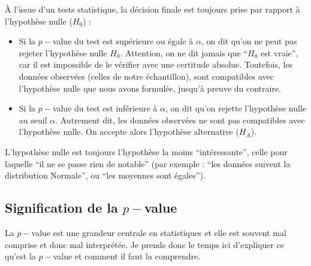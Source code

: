 \documentclass[
  a4paper,
  DIV=11,
  numbers=noendperiod,
  oneside]{scrreprt}
\providecommand{\tightlist}{%
  \setlength{\itemsep}{0pt}\setlength{\parskip}{0pt}}\usepackage{longtable,booktabs,array}
\begin{document}
\begin{tcolorbox}[enhanced jigsaw, breakable, toprule=.15mm, colbacktitle=quarto-callout-warning-color!10!white, colframe=quarto-callout-warning-color-frame, arc=.35mm, bottomtitle=1mm, opacityback=0, title=\textcolor{quarto-callout-warning-color}{\faExclamationTriangle}\hspace{0.5em}{Tests et décision : rappel de cours}, bottomrule=.15mm, colback=white, toptitle=1mm, rightrule=.15mm, leftrule=.75mm, opacitybacktitle=0.6, left=2mm, titlerule=0mm, coltitle=black]

À l'issue d'un tests statistique, la décision finale est toujours prise
par rapport à l'hypothèse nulle (\(H_0\)) :

\begin{itemize}
\tightlist
\item
  Si la \(p-\)value du test est supérieure ou égale à \(\alpha\), on dit
  qu'on ne peut pas rejeter l'hypothèse nulle \(H_0\). Attention, on ne
  dit jamais que ``\(H_0\) est vraie'', car il est impossible de le
  vérifier avec une certitude absolue. Toutefois, les données observées
  (celles de notre échantillon), sont compatibles avec l'hypothèse nulle
  que nous avons formulée, jusqu'à preuve du contraire.
\item
  Si la \(p-\)value du test est inférieure à \(\alpha\), on dit qu'on
  rejette l'hypothèse nulle au seuil \(\alpha\). Autrement dit, les
  données observées ne sont pas compatibles avec l'hypothèse nulle. On
  accepte alors l'hypothèse alternative (\(H_A\)).
\end{itemize}

L'hypothèse nulle est toujours l'hypothèse la moins ``intéressante'',
celle pour laquelle ``il ne se passe rien de notable'' (par exemple :
``les données suivent la distribution Normale'', ou ``les moyennes sont
égales'').

\end{tcolorbox}

\hypertarget{signification-de-la-p-value}{%
\subsection{\texorpdfstring{Signification de la
\(p-\)value}{Signification de la p-value}}\label{signification-de-la-p-value}}

La \(p-\)value est une grandeur centrale en statistiques et elle est
souvent mal comprise et donc mal interprétée. Je prends donc le temps
ici d'expliquer ce qu'est la \(p-\)value et comment il faut la
comprendre.
\end{document}

